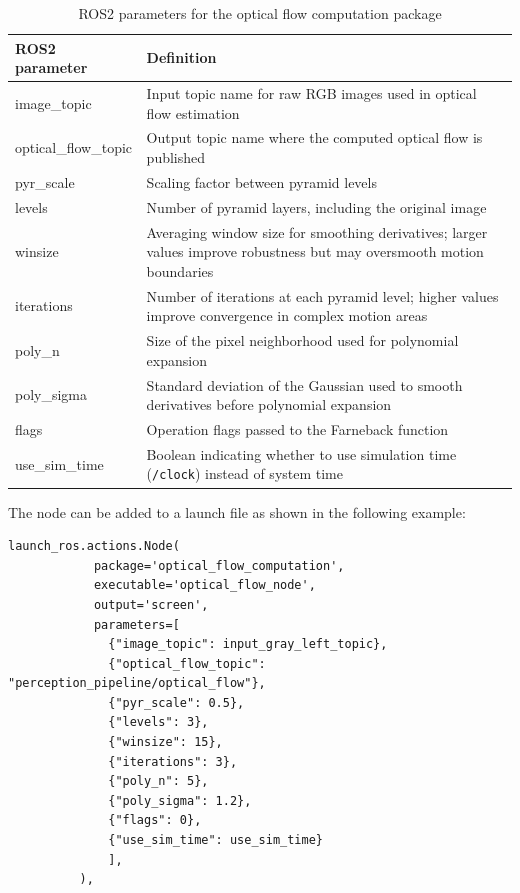 \begin{table}[H]
  \begin{tabular}{|l|l|}
  \hline
  ROS2 parameter       & Definition \\ \hline
  image\_topic         & Input topic name for raw RGB images used in optical flow estimation \\ \hline
  optical\_flow\_topic & Output topic name where the computed optical flow is published \\ \hline
  pyr\_scale           & Scaling factor between pyramid levels \\ \hline
  levels               & Number of pyramid layers, including the original image \\ \hline
  winsize              & Averaging window size for smoothing derivatives; larger values improve robustness but may oversmooth motion boundaries \\ \hline
  iterations           & Number of iterations at each pyramid level; higher values improve convergence in complex motion areas \\ \hline
  poly\_n              & Size of the pixel neighborhood used for polynomial expansion \\ \hline
  poly\_sigma          & Standard deviation of the Gaussian used to smooth derivatives before polynomial expansion \\ \hline
  flags                & Operation flags passed to the Farneback function \\ \hline
  use\_sim\_time       & Boolean indicating whether to use simulation time (\texttt{/clock}) instead of system time \\ \hline
  \end{tabular}
  \caption{ROS2 parameters for the optical flow computation package}
  \label{tab:opf_flw_ros2_params}
\end{table}

The node can be added to a launch file as shown in the following example:

\begin{lstlisting}[language=FTMpython,style=PythonStyleFTM,caption={Optical flow computation launch},label={code:opf_flw_launch}]
launch_ros.actions.Node(
            package='optical_flow_computation', 
            executable='optical_flow_node',
            output='screen',
            parameters=[
              {"image_topic": input_gray_left_topic},
              {"optical_flow_topic": "perception_pipeline/optical_flow"},
              {"pyr_scale": 0.5},
              {"levels": 3},
              {"winsize": 15},
              {"iterations": 3},
              {"poly_n": 5},
              {"poly_sigma": 1.2},
              {"flags": 0},
              {"use_sim_time": use_sim_time}
              ],
          ),
\end{lstlisting}%

